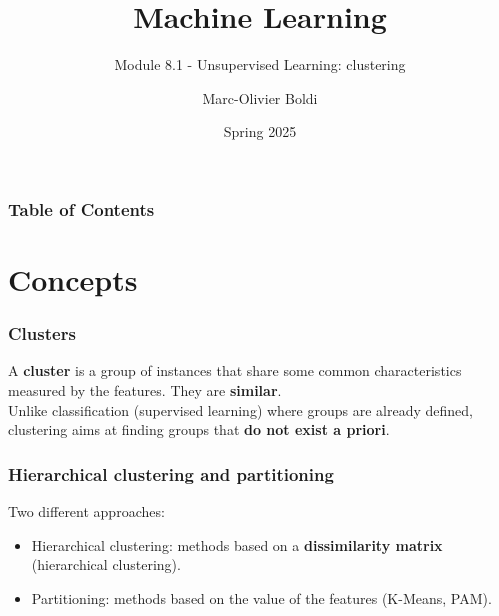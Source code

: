 
\title{Machine Learning}
\subtitle{Module 8.1 - Unsupervised Learning: clustering}
\author[MOB]{Marc-Olivier Boldi}
\date{Spring 2025}

\begin{frame}
  \titlepage
\end{frame}
\begin{frame}
\frametitle{Table of Contents}
	\tableofcontents
\end{frame}
\section{Concepts}
\begin{frame}
\frametitle{Clusters}
A {\bf cluster} is a group of instances that share some common characteristics measured by the features. They are {\bf similar}. \\ 
\vspace{0.3cm}
Unlike classification (supervised learning) where groups are already defined, clustering aims at finding groups that {\bf do not exist a priori}.
\end{frame}
\begin{frame}
\frametitle{Hierarchical clustering and partitioning}
Two different approaches: 
\begin{itemize} 
\item Hierarchical clustering: methods based on a {\bf dissimilarity matrix} (hierarchical clustering).
\item Partitioning: methods based on the value of the features (K-Means, PAM). 
\end{itemize}
\end{frame}
